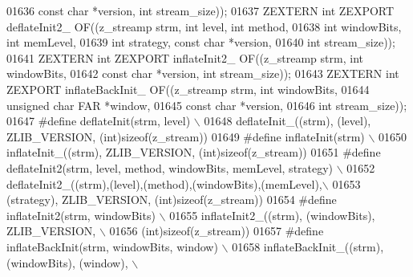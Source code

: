 \begin{DoxyCode}
01636                                      \textcolor{keyword}{const} \textcolor{keywordtype}{char} *version, \textcolor{keywordtype}{int} stream\_size));
01637 ZEXTERN \textcolor{keywordtype}{int} ZEXPORT deflateInit2\_ OF((z\_streamp strm, \textcolor{keywordtype}{int}  level, \textcolor{keywordtype}{int}  method,
01638                                       \textcolor{keywordtype}{int} windowBits, \textcolor{keywordtype}{int} memLevel,
01639                                       \textcolor{keywordtype}{int} strategy, \textcolor{keyword}{const} \textcolor{keywordtype}{char} *version,
01640                                       \textcolor{keywordtype}{int} stream\_size));
01641 ZEXTERN \textcolor{keywordtype}{int} ZEXPORT inflateInit2\_ OF((z\_streamp strm, \textcolor{keywordtype}{int}  windowBits,
01642                                       \textcolor{keyword}{const} \textcolor{keywordtype}{char} *version, \textcolor{keywordtype}{int} stream\_size));
01643 ZEXTERN \textcolor{keywordtype}{int} ZEXPORT inflateBackInit\_ OF((z\_streamp strm, \textcolor{keywordtype}{int} windowBits,
01644                                          \textcolor{keywordtype}{unsigned} \textcolor{keywordtype}{char} FAR *window,
01645                                          \textcolor{keyword}{const} \textcolor{keywordtype}{char} *version,
01646                                          \textcolor{keywordtype}{int} stream\_size));
01647 \textcolor{preprocessor}{#define deflateInit(strm, level) \(\backslash\)}
01648 \textcolor{preprocessor}{        deflateInit\_((strm), (level), ZLIB\_VERSION, (int)sizeof(z\_stream))}
01649 \textcolor{preprocessor}{#define inflateInit(strm) \(\backslash\)}
01650 \textcolor{preprocessor}{        inflateInit\_((strm), ZLIB\_VERSION, (int)sizeof(z\_stream))}
01651 \textcolor{preprocessor}{#define deflateInit2(strm, level, method, windowBits, memLevel, strategy) \(\backslash\)}
01652 \textcolor{preprocessor}{        deflateInit2\_((strm),(level),(method),(windowBits),(memLevel),\(\backslash\)}
01653 \textcolor{preprocessor}{                      (strategy), ZLIB\_VERSION, (int)sizeof(z\_stream))}
01654 \textcolor{preprocessor}{#define inflateInit2(strm, windowBits) \(\backslash\)}
01655 \textcolor{preprocessor}{        inflateInit2\_((strm), (windowBits), ZLIB\_VERSION, \(\backslash\)}
01656 \textcolor{preprocessor}{                      (int)sizeof(z\_stream))}
01657 \textcolor{preprocessor}{#define inflateBackInit(strm, windowBits, window) \(\backslash\)}
01658 \textcolor{preprocessor}{        inflateBackInit\_((strm), (windowBits), (window), \(\backslash\)}

\end{DoxyCode}
